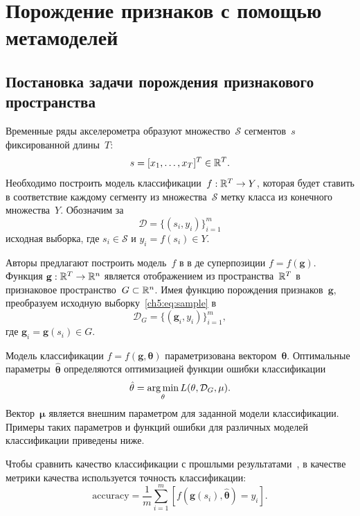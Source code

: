 \chapter{Порождение признаков с помощью метамоделей}


\section{Постановка задачи порождения признакового пространства}
Временные ряды акселерометра образуют множество~$\mathcal{S}$ сегментов~$s$ фиксированной длины~$T$:
\begin{equation}
s = [x_1, \dots, x_T]^{T} \in \mathbb{R}^T.
\label{ch5:eq:time_series}
\end{equation}
Необходимо построить модель классификации~$f: \mathbb{R}^T \rightarrow Y$, которая будет ставить в соответствие каждому сегменту из множества~$\mathcal{S}$ метку класса из конечного множества~$Y$.
Обозначим за
\begin{equation}
	\mathcal{D} = \{(s_i, y_i)\}_{i=1}^m
	\label{ch5:eq:sample}
\end{equation}
исходная выборка, где $s_i \in \mathcal{S}$ и $y_i = f(s_i)\in Y$.

Авторы предлагают построить модель~$f$ в в де суперпозиции $f=f(\mathbf{g})$.
Функция $\mathbf{g}: \mathbb{R}^T \rightarrow \mathbb{R}^n$ является отображением из пространства~$\mathbb{R}^{T} $ в признаковое пространство~$G \subset \mathbb{R}^n$.
Имея функцию порождения признаков~$\mathbf{g}$, преобразуем исходную выборку~\eqref{ch5:eq:sample} в
\[
	\mathcal{D}_G = \{(\mathbf{g}_i, y_i)\}_{i=1}^m,
\]
где $\mathbf{g}_i = \mathbf{g}(s_i) \in G$. 

Модель классификации $f=f(\mathbf{g}, \mathbf{\theta})$ параметризована вектором~$\boldsymbol{\theta}$. 
Оптимальные параметры~$\hat{\mathbf{\theta}}$ определяются оптимизацией функции ошибки классификации
\begin{equation}
\hat{\mathbf{\theta}} = \mathop{\arg \min}\limits_{\mathbf{\theta}} L(\mathbf{\theta}, \mathcal{D}_G, \mathbf{\mu}).
\label{ch5:eq:optimal_classification_params}
\end{equation}
Вектор~$\mathbf{\mu}$ является внешним параметром для заданной модели классификации. 
Примеры таких параметров и функций ошибки для различных моделей классификации приведены ниже.

Чтобы сравнить качество классификации с прошлыми результатами~\cite{karasikov2016feature,ivkin2015ts}, в качестве метрики качества используется точность классификации:
\begin{equation}
	\mathrm{accuracy} = \frac{1}{m} \sum_{i=1}^{m} \left[f\left(\mathbf{g}(s_i), \hat{\mathbf{\theta}} \right)= y_i\right].
	\label{ch5:eq:accuracy}
\end{equation}

